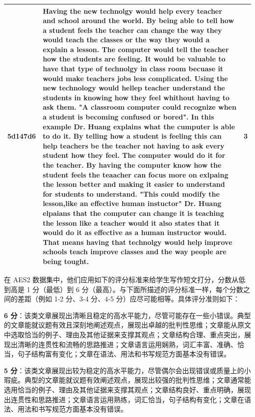 \begin{table}[htbp]
\begin{tabular}{cp{12cm}c}
5d147d6 & Having the new technolgy would   help every teacher and school around the world. By being able to tell how a   student feels the teacher can change the way they would teach the classes or   the way they would a explain a lesson. The computer would tell the teacher   how the students are feeling. It would be valuable to have that type of   technolgy in class room becuase it would make teachers jobs less   complicated. Using the new technology would hellep teacher understand the   students in knowing how they feel whithout having to ask them. "A   classroom computer could recognize when a student is becoming confused or   bored". In this example Dr. Huang explains what the cumputer is able to   do it. By telling how a student is feeling this can help teachers be the   teacher not having to ask every student how they feel. The computer would do   it for the teacher. By having the computer know how the student feels the   teaacher can focus more on exlpaing the lesson better and making it easier to   understand for students to understand. "This could modify the   lesson,like an effective human instuctor" Dr. Huang elpaians that   the computer can change it is teaching the lesson like a teacher would it   also states that it would do it as effective as a human instructor would.   That means having that technolgy would help improve schools teach improve   classes and the way people are being tought. & 3  \\ \bottomrule
\end{tabular}
\end{table}

在 AES2 数据集中，他们应用如下的评分标准来给学生写作短文打分，分数从低到高是 1 分（最低）到 6 分（最高）。与下面所描述的评分标准一样，每个分数之间的差距（例如 1-2 分、3-4 分、4-5 分）应尽可能相等。具体评分准则如下：

\textbf{6 分}：该类文章展现出清晰且稳定的高水平能力，尽管可能存在一些小错误。典型的文章能就议题有效且深刻地阐述观点，展现出卓越的批判性思维；文章能从原文中选取恰当的例子、理由及其他证据来支撑其观点；文章结构合理、重点突出，展现出清晰的连贯性和流畅的思路推进；文章语言运用娴熟，词汇丰富、准确、恰当，句子结构富有变化；文章在语法、用法和书写规范方面基本没有错误。

\textbf{5 分}：该类文章展现出较为稳定的高水平能力，尽管偶尔会出现错误或质量上的小瑕疵。典型的文章能就议题有效阐述观点，展现出较强的批判性思维；文章通常能选用恰当的例子、理由及其他证据来支撑其观点；文章结构良好、重点明确，展现出连贯性和思路推进；文章语言运用熟练，词汇恰当，句子结构有变化；文章在语法、用法和书写规范方面基本没有错误。


